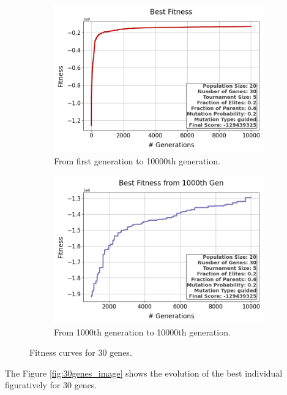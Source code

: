 \documentclass{assignment}
\begin{document}
\begin{figure}[H]
    \begin{subfigure}{0.5\textwidth}
        \includegraphics[width=\textwidth]{figures/best_fitness_output_20_30_5_0.2_0.6_0.2_guided.png}
        \caption{From first generation to 10000th generation.}
    \end{subfigure}\hfill
    \begin{subfigure}{0.5\textwidth}
        \includegraphics[width=\textwidth]{figures/best_fitness_1000_output_20_30_5_0.2_0.6_0.2_guided.png}
        \caption{From 1000th generation to 10000th generation.}
    \end{subfigure}
    \caption{Fitness curves for 30 genes.}
\label{fig:30genes}
\end{figure}

The Figure \ref{fig:30genes_image} shows the evolution of the best individual figuratively for 30 genes.
\end{document}
